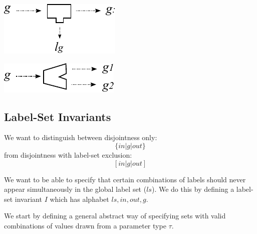 \includegraphics{images/new-label}

\includegraphics{images/split-gen}


\subsection{Label-Set Invariants}


We want to distinguish between disjointness only:
\[ \{ in | g | out \} \]
from disjointness with label-set exclusion:
\[ [ in | g | out ] \]

We want to be able to specify that certain combinations
of labels should never appear simultaneously
in the global label set ($ls$).
We do this by defining a label-set invariant $I$
which has alphabet $ls,in,out,g$.

We start by defining a general abstract way of specifying
sets with valid combinations
of values drawn from a parameter type $\tau$.

